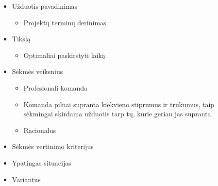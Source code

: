\documentclass[10pt]{IEEEtran}
\begin{document}
            \begin{itemize}
                \item Užduotis pavadinimas
                \begin{itemize}
                    \item Projektų terminų derinimas
                \end{itemize}
                \item Tikslą
                \begin{itemize}
                    \item Optimaliai paskirstyti laiką
                \end{itemize}
                \item Sėkmės veiksnius
                \begin{itemize}
                    \item Profesionali komanda
                    \item Komanda pilnai supranta kiekvieno stiprumus ir trūkumus, taip sėkmingai skirdama užduotis tarp tų, kurie geriau jas supranta.
                    \item Racionalus 
                \end{itemize}
                \item Sėkmės vertinimo kriterijus
                \begin{itemize}
                \end{itemize}
                \item Ypatingas situacijas
                \begin{itemize}
                \end{itemize}
                \item Variantus
                \begin{itemize}
                \end{itemize}
            \end{itemize}
\end{document}
